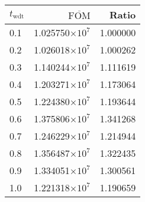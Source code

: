 \begin{tabular}{lrr}
\toprule
$t_{\mathrm{wdt}}$ & $\overline{\mathrm{FOM}}$ &    Ratio \\
\midrule
               0.1 &   1.025750$\times 10^{7}$ & 1.000000 \\
               0.2 &   1.026018$\times 10^{7}$ & 1.000262 \\
               0.3 &   1.140244$\times 10^{7}$ & 1.111619 \\
               0.4 &   1.203271$\times 10^{7}$ & 1.173064 \\
               0.5 &   1.224380$\times 10^{7}$ & 1.193644 \\
               0.6 &   1.375806$\times 10^{7}$ & 1.341268 \\
               0.7 &   1.246229$\times 10^{7}$ & 1.214944 \\
               0.8 &   1.356487$\times 10^{7}$ & 1.322435 \\
               0.9 &   1.334051$\times 10^{7}$ & 1.300561 \\
               1.0 &   1.221318$\times 10^{7}$ & 1.190659 \\
\bottomrule
\end{tabular}
